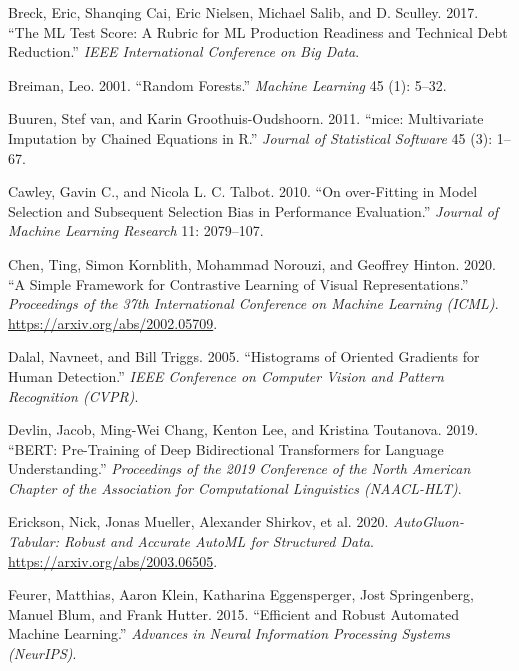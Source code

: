 \begin{CSLReferences}{1}{1}
Breck, Eric, Shanqing Cai, Eric Nielsen, Michael Salib, and D. Sculley. 2017. {``The {ML} Test Score: A Rubric for {ML} Production Readiness and Technical Debt Reduction.''} \emph{IEEE International Conference on Big Data}.

Breiman, Leo. 2001. {``Random Forests.''} \emph{Machine Learning} 45 (1): 5--32.

Buuren, Stef van, and Karin Groothuis-Oudshoorn. 2011. {``{mice}: Multivariate Imputation by Chained Equations in {R}.''} \emph{Journal of Statistical Software} 45 (3): 1--67.

Cawley, Gavin C., and Nicola L. C. Talbot. 2010. {``On over-Fitting in Model Selection and Subsequent Selection Bias in Performance Evaluation.''} \emph{Journal of Machine Learning Research} 11: 2079--107.

Chen, Ting, Simon Kornblith, Mohammad Norouzi, and Geoffrey Hinton. 2020. {``A Simple Framework for Contrastive Learning of Visual Representations.''} \emph{Proceedings of the 37th International Conference on Machine Learning (ICML)}. \url{https://arxiv.org/abs/2002.05709}.

Dalal, Navneet, and Bill Triggs. 2005. {``Histograms of Oriented Gradients for Human Detection.''} \emph{IEEE Conference on Computer Vision and Pattern Recognition (CVPR)}.

Devlin, Jacob, Ming-Wei Chang, Kenton Lee, and Kristina Toutanova. 2019. {``{BERT}: Pre-Training of Deep Bidirectional Transformers for Language Understanding.''} \emph{Proceedings of the 2019 Conference of the North American Chapter of the Association for Computational Linguistics (NAACL-HLT)}.

Erickson, Nick, Jonas Mueller, Alexander Shirkov, et al. 2020. \emph{{AutoGluon-Tabular}: Robust and Accurate {AutoML} for Structured Data}. \url{https://arxiv.org/abs/2003.06505}.

Feurer, Matthias, Aaron Klein, Katharina Eggensperger, Jost Springenberg, Manuel Blum, and Frank Hutter. 2015. {``Efficient and Robust Automated Machine Learning.''} \emph{Advances in Neural Information Processing Systems (NeurIPS)}.


\end{CSLReferences}
